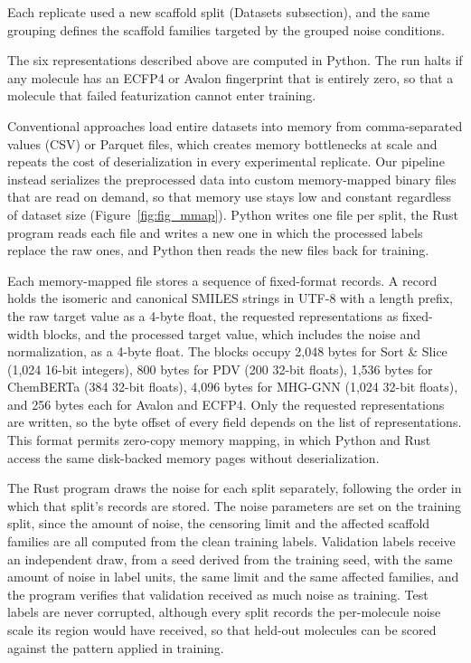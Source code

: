Each replicate used a new scaffold split (Datasets subsection), and the same grouping defines the scaffold families targeted by the grouped noise conditions.

The six representations described above are computed in Python. The run halts if any molecule has an ECFP4 or Avalon fingerprint
that is entirely zero, so that a molecule that failed featurization cannot enter training.

Conventional approaches load entire datasets into memory from comma-separated values (CSV) or Parquet files, which creates memory bottlenecks at scale and repeats the cost of deserialization in every experimental replicate. Our pipeline instead serializes the preprocessed data into custom memory-mapped binary files that are read on demand, so that memory use stays low and constant regardless of dataset size (Figure~\ref{fig:fig_mmap}). Python writes one file per split, the Rust program reads each file and writes a new one in which the processed labels replace the raw ones, and Python then reads the new files back for training.

Each memory-mapped file stores a sequence of fixed-format records. A record holds the isomeric and canonical SMILES strings in UTF-8 with a length prefix, the raw target value as a 4-byte float, the requested representations as fixed-width blocks, and the processed target value, which includes the noise and normalization, as a 4-byte float. The blocks occupy 2,048 bytes for Sort \& Slice (1,024 16-bit integers), 800 bytes for PDV (200 32-bit floats), 1,536 bytes for ChemBERTa (384 32-bit floats), 4,096 bytes for MHG-GNN (1,024 32-bit floats), and 256 bytes each for Avalon and ECFP4. Only the requested representations are written, so the byte offset of every field depends on the list of representations. This format permits zero-copy memory mapping, in which Python and Rust access the same disk-backed memory pages without deserialization.

The Rust program draws the noise for each split separately, following the order in which that
split's records are stored. The noise parameters are set on the training split, since the amount of
noise, the censoring limit and the affected scaffold families are all computed from the clean
training labels. Validation labels receive an independent draw, from a seed derived from the
training seed, with the same amount of noise in label units, the same limit and the same affected
families, and the program verifies that validation received as much noise as training. Test labels
are never corrupted, although every split records the per-molecule noise scale its region would
have received, so that held-out molecules can be scored against the pattern applied in training.

